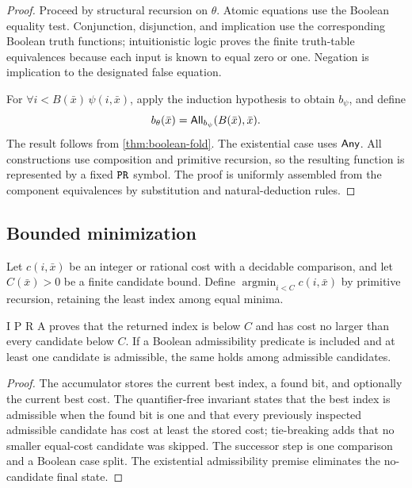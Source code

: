 \begin{proof}
Proceed by structural recursion on \(\theta\).  Atomic equations use the
Boolean equality test.  Conjunction, disjunction, and implication use the
corresponding Boolean truth functions; intuitionistic logic proves the finite
truth-table equivalences because each input is known to equal zero or one.
Negation is implication to the designated false equation.

For \(\forall i<B(\bar x)\,\psi(i,\bar x)\), apply the induction hypothesis to
obtain \(b_\psi\), and define
\[
 b_\theta(\bar x)=\mathsf{All}_{b_\psi}(B(\bar x),\bar x).
\]
The result follows from \cref{thm:boolean-fold}.  The existential case uses
\(\mathsf{Any}\).  All constructions use composition and primitive recursion, so the
resulting function is represented by a fixed \(\texttt{PR}\) symbol.  The proof is
uniformly assembled from the component equivalences by substitution and
natural-deduction rules.
\end{proof}

\subsection{Bounded minimization}

Let \(c(i,\bar x)\) be an integer or rational cost with a decidable comparison,
and let \(C(\bar x)>0\) be a finite candidate bound.  Define
\(\operatorname{argmin}_{i<C}c(i,\bar x)\) by primitive recursion, retaining
the least index among equal minima.

\begin{lemma}
\label{lem:finite-min}
I P R A proves that the returned index is below \(C\) and has cost no larger
than every candidate below \(C\).  If a Boolean admissibility predicate is
included and at least one candidate is admissible, the same holds among
admissible candidates.
\end{lemma}

\begin{proof}
The accumulator stores the current best index, a found bit, and optionally the
current best cost.  The quantifier-free invariant states that the best index is
admissible when the found bit is one and that every previously inspected
admissible candidate has cost at least the stored cost; tie-breaking adds that
no smaller equal-cost candidate was skipped.  The successor step is one
comparison and a Boolean case split.  The existential admissibility premise
eliminates the no-candidate final state.
\end{proof}

